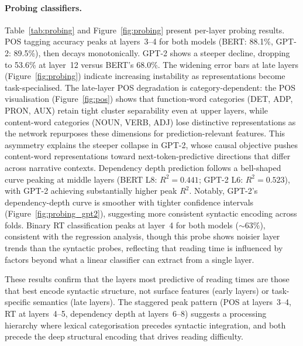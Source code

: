 \documentclass[11pt]{article}
\begin{document}
\paragraph{Probing classifiers.}
Table~\ref{tab:probing} and Figure~\ref{fig:probing} present per-layer probing results.
POS tagging accuracy peaks at layers~3--4 for both models (BERT: 88.1\%, GPT-2: 89.5\%), then decays monotonically. GPT-2 shows a steeper decline, dropping to 53.6\% at layer~12 versus BERT's 68.0\%.
The widening error bars at late layers (Figure~\ref{fig:probing}) indicate increasing instability as representations become task-specialised.
The late-layer POS degradation is category-dependent: the POS visualisation (Figure~\ref{fig:pos}) shows that function-word categories (DET, ADP, PRON, AUX) retain tight cluster separability even at upper layers, while content-word categories (NOUN, VERB, ADJ) lose distinctive representations as the network repurposes these dimensions for prediction-relevant features.
This asymmetry explains the steeper collapse in GPT-2, whose causal objective pushes content-word representations toward next-token-predictive directions that differ across narrative contexts.
Dependency depth prediction follows a bell-shaped curve peaking at middle layers (BERT L8: $R^2 = 0.441$; GPT-2 L6: $R^2 = 0.523$), with GPT-2 achieving substantially higher peak $R^2$.
Notably, GPT-2's dependency-depth curve is smoother with tighter confidence intervals (Figure~\ref{fig:probing_gpt2}), suggesting more consistent syntactic encoding across folds.
Binary RT classification peaks at layer~4 for both models (${\sim}63\%$), consistent with the regression analysis, though this probe shows noisier layer trends than the syntactic probes, reflecting that reading time is influenced by factors beyond what a linear classifier can extract from a single layer.

These results confirm that the layers most predictive of reading times are those that best encode syntactic structure, not surface features (early layers) or task-specific semantics (late layers).
The staggered peak pattern (POS at layers~3--4, RT at layers~4--5, dependency depth at layers~6--8) suggests a processing hierarchy where lexical categorisation precedes syntactic integration, and both precede the deep structural encoding that drives reading difficulty.
\end{document}
